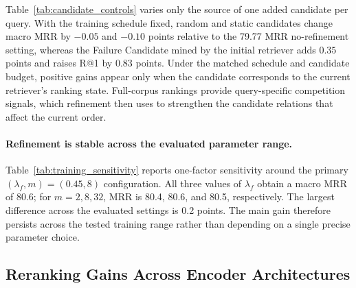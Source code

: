 \documentclass[11pt]{article}
\begin{document}
Table~\ref{tab:candidate_controls} varies only the source of one added candidate per query. With the training schedule fixed, random and static candidates change macro MRR by \(-0.05\) and \(-0.10\) points relative to the 79.77 MRR no-refinement setting, whereas the Failure Candidate mined by the initial retriever adds \(0.35\) points and raises R@1 by \(0.83\) points. Under the matched schedule and candidate budget, positive gains appear only when the candidate corresponds to the current retriever's ranking state. Full-corpus rankings provide query-specific competition signals, which refinement then uses to strengthen the candidate relations that affect the current order.

\paragraph{Refinement is stable across the evaluated parameter range.}
Table~\ref{tab:training_sensitivity} reports one-factor sensitivity around the primary \((\lambda_f,m)=(0.45,8)\) configuration. All three values of \(\lambda_f\) obtain a macro MRR of 80.6; for \(m=2,8,32\), MRR is 80.4, 80.6, and 80.5, respectively. The largest difference across the evaluated settings is 0.2 points. The main gain therefore persists across the tested training range rather than depending on a single precise parameter choice.

\subsection{Reranking Gains Across Encoder Architectures}
\label{sec:encoder_compatibility}
\end{document}
